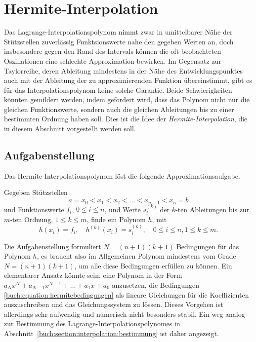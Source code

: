 %
%
%
\section{Hermite-Interpolation
\label{buch:section:hermite}}
Das Lagrange-Interpolationspolynom nimmt zwar in umittelbarer Nähe der 
Stützstellen zuverlässig Funktsionswerte nahe den gegeben Werten an,
doch insbesondere gegen den Rand des Intervals können die oft beobachteten
Oszillationen eine schlechte Approximation bewirken.
Im Gegensatz zur Taylorreihe, deren Ableitung mindestens in der Nähe des
Entwicklungspunktes auch mit der Ableitung der zu approximierenden
Funktion übereinstimmt, gibt es für das Interpolationspolynom keine
solche Garantie.
Beide Schwierigkeiten könnten gemildert werden, indem gefordert wird,
dass das Polynom nicht nur die gleichen Funktionswerte, sondern auch
die gleichen Ableitungen bis zu einer bestimmten Ordnung haben soll.
Dies ist die Idee der {\em Hermite-Interpolation},
%
die in diesem Abschnitt vorgestellt werden soll.

%
%
\subsection{Aufgabenstellung
\label{b8ch:subsection:hermite:aufgabe}}
Das Hermite-Interpolationspolynom löst die folgende Approximationsaufgabe.

\begin{aufgabe}
Gegeben Stützstellen
\[
a=x_0<x_1<x_2<\dots < x_{n-1}<x_n=b
\]
und Funktionswerte $f_i$, $0\le i\le n$, und Werte
$s_i^{(k)}$ der $k$-ten Ableitungen bis zur $m$-ten Ordnung, $1\le k\le m$,
finde ein Polynom $h$, mit
\begin{equation}
h(x_i) = f_i,\quad h^{(k)}(x_i)=s_i^{(k)},\quad 0\le i \le n, 1\le k\le m.
\label{buch:equation:hermitebedingungen}
\end{equation}
\end{aufgabe}
Die Aufgabenstellung formuliert $N=(n+1)(k+1)$ Bedingungen für das Polynom $h$,
es braucht also im Allgemeinen Polynom mindestens vom Grade $N=(n+1)(k+1)$,
um alle diese Bedingungen erfüllen zu können.
Ein elementarer Ansatz könnte sein, eine Polynom in der Form
$a_Nx^N+a_{N-1}x^{N-1}+\dots+a_1x+a_0$ anzusetzen, die Bedingungen
\eqref{buch:equation:hermitebedingungen} als lineare Gleichungen für
die Koeffizienten auszuschreiben und das Gleichungssystem zu lössen.
Dieses Vorgehen ist allerdings sehr aufwendig und numerisch nicht besonders
stabil.
Ein weg analog zur Bestimmung des Lagrange-Interpolationspolynomes in
Abschnitt~\ref{buch:section:interpolation:bestimmung}
ist daher angezeigt.


